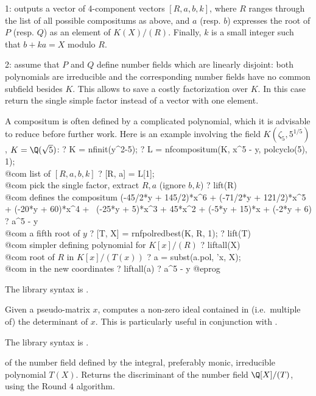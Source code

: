 1: outputs a vector of 4-component vectors $[R,a,b,k]$, where $R$
ranges through the list of all possible compositums as above, and $a$
(resp. $b$) expresses the root of $P$ (resp. $Q$) as an element of
$K(X)/(R)$. Finally, $k$ is a small integer such that $b + ka = X$ modulo
$R$.

2: assume that $P$ and $Q$ define number fields which are linearly disjoint:
both polynomials are irreducible and the corresponding number fields
have no common subfield besides $K$. This allows to save a costly
factorization over $K$. In this case return the single simple factor
instead of a vector with one element.

A compositum is often defined by a complicated polynomial, which it is
advisable to reduce before further work. Here is an example involving
the field $K(\zeta_5, 5^{1/5})$, $K=\Q(\sqrt{5})$:
\bprog
? K = nfinit(y^2-5);
? L = nfcompositum(K, x^5 - y, polcyclo(5), 1); \\@com list of $[R,a,b,k]$
? [R, a] = L[1];  \\@com pick the single factor, extract $R,a$ (ignore $b,k$)
? lift(R)         \\@com defines the compositum
(-45/2*y + 145/2)*x^6 + (-71/2*y + 121/2)*x^5 + (-20*y + 60)*x^4 +    \
(-25*y + 5)*x^3 + 45*x^2 + (-5*y + 15)*x + (-2*y + 6)
? a^5 - y         \\@com a fifth root of $y$
? [T, X] = rnfpolredbest(K, R, 1);
? lift(T)     \\@com simpler defining polynomial for $K[x]/(R)$
? liftall(X)  \\ @com root of $R$ in $K[x]/(T(x))$
? a = subst(a.pol, 'x, X);  \\@com \kbd{a} in the new coordinates
? liftall(a)
? a^5 - y
@eprog

The library syntax is .

\label{se:nfdetint}
Given a pseudo-matrix $x$, computes a
non-zero ideal contained in (i.e.~multiple of) the determinant of $x$. This
is particularly useful in conjunction with \kbd{nfhnfmod}.

The library syntax is .

\label{se:nfdisc}
 of the number field defined by the integral,
preferably monic, irreducible polynomial $T(X)$. Returns the discriminant of
the number field $\Q[X]/(T)$, using the Round $4$ algorithm.

